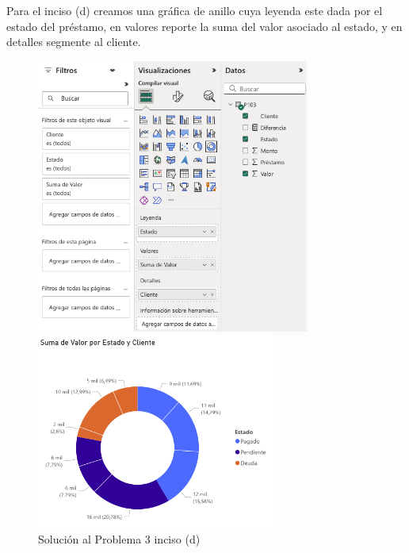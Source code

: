 \documentclass{article}
\begin{document}
\noindent
Para el inciso (d) creamos una gráfica de anillo cuya leyenda este dada por el estado del préstamo, en valores reporte la suma del valor asociado al estado, y en detalles segmente al cliente.
\begin{figure}[!h]
    \centering
    \begin{minipage}{\textwidth}
        \centering
        \includegraphics[width=0.8\textwidth]{figures/s103d-1.png}
    \end{minipage}
    \hfill
    \begin{minipage}{\textwidth}
        \centering
        \includegraphics[width=0.7\textwidth]{figures/s103d-2.png}
    \end{minipage}
    \captionsetup{width=0.9\textwidth}
    \caption{Solución al Problema 3 inciso (d)}
    \label{fig:s103d}
\end{figure}
\end{document}
